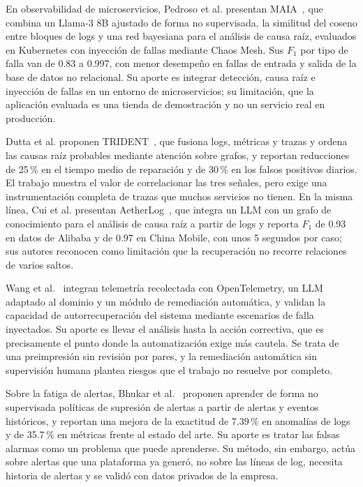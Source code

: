 En observabilidad de microservicios, Pedroso et al. presentan MAIA~\cite{pedroso2025_maia}, que combina un Llama-3 8B ajustado de forma no supervisada, la similitud del coseno entre bloques de logs y una red bayesiana para el análisis de causa raíz, evaluados en Kubernetes con inyección de fallas mediante Chaos Mesh. Sus $F_1$ por tipo de falla van de 0.83 a 0.997, con menor desempeño en fallas de entrada y salida de la base de datos no relacional. Su aporte es integrar detección, causa raíz e inyección de fallas en un entorno de microservicios; su limitación, que la aplicación evaluada es una tienda de demostración y no un servicio real en producción.

Dutta et al. proponen TRIDENT~\cite{dutta2025_trident}, que fusiona logs, métricas y trazas y ordena las causas raíz probables mediante atención sobre grafos, y reportan reducciones de 25\,\% en el tiempo medio de reparación y de 30\,\% en los falsos positivos diarios. El trabajo muestra el valor de correlacionar las tres señales, pero exige una instrumentación completa de trazas que muchos servicios no tienen. En la misma línea, Cui et al. presentan AetherLog~\cite{cui2025_aetherlog}, que integra un LLM con un grafo de conocimiento para el análisis de causa raíz a partir de logs y reporta $F_1$ de 0.93 en datos de Alibaba y de 0.97 en China Mobile, con unos 5 segundos por caso; sus autores reconocen como limitación que la recuperación no recorre relaciones de varios saltos.

Wang et al.~\cite{wang2025_cloudnative_rca} integran telemetría recolectada con OpenTelemetry, un LLM adaptado al dominio y un módulo de remediación automática, y validan la capacidad de autorrecuperación del sistema mediante escenarios de falla inyectados. Su aporte es llevar el análisis hasta la acción correctiva, que es precisamente el punto donde la automatización exige más cautela. Se trata de una preimpresión sin revisión por pares, y la remediación automática sin supervisión humana plantea riesgos que el trabajo no resuelve por completo.

Sobre la fatiga de alertas, Bhukar et al.~\cite{bhukar2024_alertsuppression} proponen aprender de forma no supervisada políticas de supresión de alertas a partir de alertas y eventos históricos, y reportan una mejora de la exactitud de 7.39\,\% en anomalías de logs y de 35.7\,\% en métricas frente al estado del arte. Su aporte es tratar las falsas alarmas como un problema que puede aprenderse. Su método, sin embargo, actúa sobre alertas que una plataforma ya generó, no sobre las líneas de log, necesita historia de alertas y se validó con datos privados de la empresa.

